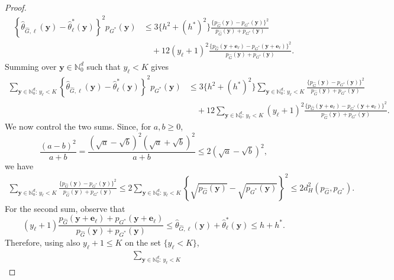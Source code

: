 \documentclass[10pt,a4paper]{amsart}
\begin{document}
\begin{proof}
\begin{align*}
\left\{
\hat\theta_{\widehat G,\ell}(\boldsymbol y)
-
\hat\theta_\ell^\ast(\boldsymbol y)
\right\}^2
p_{G^\ast}(\boldsymbol y)
&\leq
3\{h^2+(h^\ast)^2\}
\frac{
\{p_{\widehat G}(\boldsymbol y)-p_{G^\ast}(\boldsymbol y)\}^2
}{
p_{\widehat G}(\boldsymbol y)+p_{G^\ast}(\boldsymbol y)
}
\\
&\quad
+
12(y_\ell+1)^2
\frac{
\{p_{\widehat G}(\boldsymbol y+\boldsymbol e_\ell)
-
p_{G^\ast}(\boldsymbol y+\boldsymbol e_\ell)\}^2
}{
p_{\widehat G}(\boldsymbol y)+p_{G^\ast}(\boldsymbol y)
}.
\end{align*}
Summing over $\boldsymbol y\in\mathbb N_0^d$ such that $y_\ell<K$ gives
\[
\begin{aligned}
\sum_{\boldsymbol y\in\mathbb N_0^d:\,y_\ell<K}
\left\{
\hat\theta_{\widehat G,\ell}(\boldsymbol y)
-
\hat\theta_\ell^\ast(\boldsymbol y)
\right\}^2
p_{G^\ast}(\boldsymbol y)
&\leq
3\{h^2+(h^\ast)^2\}
\sum_{\boldsymbol y\in\mathbb N_0^d:\,y_\ell<K}
\frac{
\{p_{\widehat G}(\boldsymbol y)-p_{G^\ast}(\boldsymbol y)\}^2
}{
p_{\widehat G}(\boldsymbol y)+p_{G^\ast}(\boldsymbol y)
}
\\
&\quad
+
12
\sum_{\boldsymbol y\in\mathbb N_0^d:\,y_\ell<K}
(y_\ell+1)^2
\frac{
\{p_{\widehat G}(\boldsymbol y+\boldsymbol e_\ell)
-
p_{G^\ast}(\boldsymbol y+\boldsymbol e_\ell)\}^2
}{
p_{\widehat G}(\boldsymbol y)+p_{G^\ast}(\boldsymbol y)
}.
\end{aligned}
\]
We now control the two sums. Since, for $a,b\geq0$,
\[
\frac{(a-b)^2}{a+b}
=
\frac{(\sqrt a-\sqrt b)^2(\sqrt a+\sqrt b)^2}{a+b}
\leq
2(\sqrt a-\sqrt b)^2,
\]
we have
\begin{align*}
\sum_{\boldsymbol y\in\mathbb N_0^d:\,y_\ell<K}
\frac{
\{p_{\widehat G}(\boldsymbol y)-p_{G^\ast}(\boldsymbol y)\}^2
}{
p_{\widehat G}(\boldsymbol y)+p_{G^\ast}(\boldsymbol y)
}
\leq
2
\sum_{\boldsymbol y\in\mathbb N_0^d:\,y_\ell<K}
\left\{
\sqrt{p_{\widehat G}(\boldsymbol y)}
-
\sqrt{p_{G^\ast}(\boldsymbol y)}
\right\}^2
\leq
2d_H^2(p_{\widehat G},p_{G^\ast}).
\end{align*}
For the second sum, observe that
\[
(y_\ell+1)
\frac{
p_{\widehat G}(\boldsymbol y+\boldsymbol e_\ell)
+
p_{G^\ast}(\boldsymbol y+\boldsymbol e_\ell)
}{
p_{\widehat G}(\boldsymbol y)+p_{G^\ast}(\boldsymbol y)
}
\leq \hat\theta_{\widehat G,\ell}(\boldsymbol y)+ \hat\theta_\ell^\ast(\boldsymbol y)\leq 
h+h^\ast.
\]
Therefore, using also $y_\ell+1\leq K$ on the set $\{y_\ell<K\}$,
\begin{align*}
&\sum_{\boldsymbol y\in\mathbb N_0^d:\,y_\ell<K}

\end{align*}
\end{proof}
\end{document}
